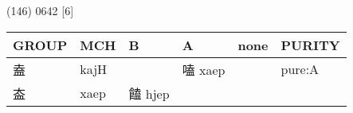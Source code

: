 \documentclass[14pt,a4paper]{scrartcl}
\begin{document}
(146) 0642 {[}6{]}

\begin{longtable}[c]{@{}llllll@{}}
\toprule
\begin{minipage}[b]{0.14\columnwidth}\raggedright\strut
GROUP
\strut\end{minipage} &
\begin{minipage}[b]{0.14\columnwidth}\raggedright\strut
MCH
\strut\end{minipage} &
\begin{minipage}[b]{0.14\columnwidth}\raggedright\strut
B
\strut\end{minipage} &
\begin{minipage}[b]{0.14\columnwidth}\raggedright\strut
A
\strut\end{minipage} &
\begin{minipage}[b]{0.14\columnwidth}\raggedright\strut
none
\strut\end{minipage} &
\begin{minipage}[b]{0.14\columnwidth}\raggedright\strut
PURITY
\strut\end{minipage}\tabularnewline
\midrule
\endhead
\begin{minipage}[t]{0.14\columnwidth}\raggedright\strut
盍
\strut\end{minipage} &
\begin{minipage}[t]{0.14\columnwidth}\raggedright\strut
kajH
\strut\end{minipage} &
\begin{minipage}[t]{0.14\columnwidth}\raggedright\strut
\strut\end{minipage} &
\begin{minipage}[t]{0.14\columnwidth}\raggedright\strut
嗑 xaep
\strut\end{minipage} &
\begin{minipage}[t]{0.14\columnwidth}\raggedright\strut
\strut\end{minipage} &
\begin{minipage}[t]{0.14\columnwidth}\raggedright\strut
pure:A
\strut\end{minipage}\tabularnewline
\begin{minipage}[t]{0.14\columnwidth}\raggedright\strut
盇
\strut\end{minipage} &
\begin{minipage}[t]{0.14\columnwidth}\raggedright\strut
xaep
\strut\end{minipage} &
\begin{minipage}[t]{0.14\columnwidth}\raggedright\strut
饁 hjep
\strut\end{minipage} &

\end{longtable}
\end{document}
